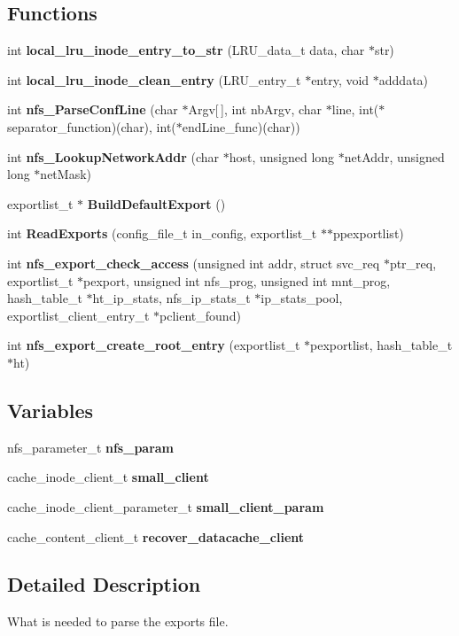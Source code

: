 \subsection*{Functions}
\begin{CompactItemize}
\item 
int {\bf local\_\-lru\_\-inode\_\-entry\_\-to\_\-str} (LRU\_\-data\_\-t data, char $\ast$str)
\item 
int {\bf local\_\-lru\_\-inode\_\-clean\_\-entry} (LRU\_\-entry\_\-t $\ast$entry, void $\ast$adddata)
\item 
int {\bf nfs\_\-Parse\-Conf\-Line} (char $\ast$Argv[$\,$], int nb\-Argv, char $\ast$line, int($\ast$separator\_\-function)(char), int($\ast$end\-Line\_\-func)(char))
\item 
int {\bf nfs\_\-Lookup\-Network\-Addr} (char $\ast$host, unsigned long $\ast$net\-Addr, unsigned long $\ast$net\-Mask)
\item 
exportlist\_\-t $\ast$ {\bf Build\-Default\-Export} ()
\item 
int {\bf Read\-Exports} (config\_\-file\_\-t in\_\-config, exportlist\_\-t $\ast$$\ast$ppexportlist)
\item 
int {\bf nfs\_\-export\_\-check\_\-access} (unsigned int addr, struct svc\_\-req $\ast$ptr\_\-req, exportlist\_\-t $\ast$pexport, unsigned int nfs\_\-prog, unsigned int mnt\_\-prog, hash\_\-table\_\-t $\ast$ht\_\-ip\_\-stats, nfs\_\-ip\_\-stats\_\-t $\ast$ip\_\-stats\_\-pool, exportlist\_\-client\_\-entry\_\-t $\ast$pclient\_\-found)
\item 
int {\bf nfs\_\-export\_\-create\_\-root\_\-entry} (exportlist\_\-t $\ast$pexportlist, hash\_\-table\_\-t $\ast$ht)
\end{CompactItemize}
\subsection*{Variables}
\begin{CompactItemize}
\item 
nfs\_\-parameter\_\-t {\bf nfs\_\-param}
\item 
cache\_\-inode\_\-client\_\-t {\bf small\_\-client}
\item 
cache\_\-inode\_\-client\_\-parameter\_\-t {\bf small\_\-client\_\-param}
\item 
cache\_\-content\_\-client\_\-t {\bf recover\_\-datacache\_\-client}
\end{CompactItemize}


\subsection{Detailed Description}
What is needed to parse the exports file. 

